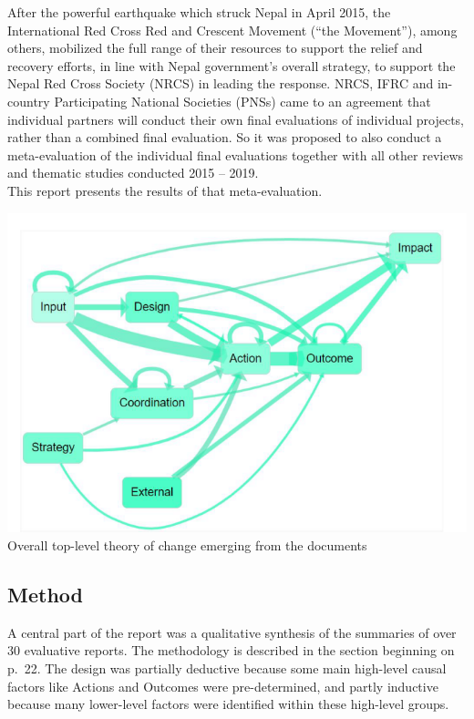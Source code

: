\documentclass[
]{book}
\begin{document}
After the powerful earthquake which struck Nepal in April 2015, the International Red Cross Red and Crescent Movement (``the Movement''), among others, mobilized the full range of their resources to support the relief and recovery efforts, in line with Nepal government's overall strategy, to support the Nepal Red Cross Society (NRCS) in leading the response. NRCS, IFRC and in-country Participating National Societies (PNSs) came to an agreement that individual partners will conduct their own final evaluations of individual projects, rather than a combined final evaluation. So it was proposed to also conduct a meta-evaluation of the individual final evaluations together with all other reviews and thematic studies conducted 2015 -- 2019.\\
This report presents the results of that meta-evaluation.

\includegraphics{_assets/f184ac06895268db126fca2e3d51ed31.png}Overall top-level theory of change emerging from the documents

\hypertarget{method}{%
\subsection{Method}\label{method}}

A central part of the report was a qualitative synthesis of the summaries of over 30 evaluative reports. The methodology is described in the section beginning on p.~22. The design was partially deductive because some main high-level causal factors like Actions and Outcomes were pre-determined, and partly inductive because many lower-level factors were identified within these high-level groups.
\end{document}
